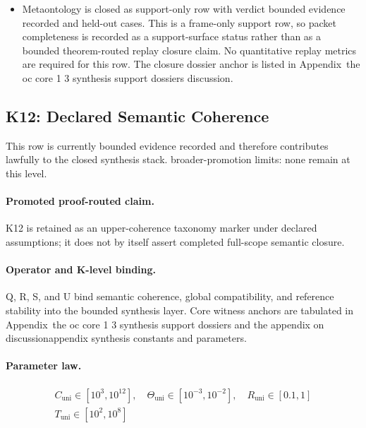 \begin{itemize}[leftmargin=1.6em,nosep]
\item Metaontology is closed as support-only row with verdict bounded evidence recorded and  held-out cases. This is a frame-only support row, so packet completeness is recorded as a support-surface status rather than as a bounded theorem-routed replay closure claim. No quantitative replay metrics are required for this row. The closure dossier anchor is listed in Appendix~the oc core 1 3 synthesis support dossiers discussion.
\end{itemize}

\subsection{K12: Declared Semantic Coherence}
\label{sec:oc-core-1-3-synthesis-k12}
This row is currently bounded evidence recorded and therefore contributes lawfully to the closed synthesis stack.
broader-promotion limits: none remain at this level.

\paragraph{Promoted proof-routed claim.}
K12 is retained as an upper-coherence taxonomy marker under declared assumptions; it does not by itself assert completed full-scope semantic closure.

\paragraph{Operator and K-level binding.}
Q, R, S, and U bind semantic coherence, global compatibility, and reference stability into the bounded synthesis layer.
Core witness anchors are tabulated in Appendix~the oc core 1 3 synthesis support dossiers and the appendix on discussionappendix synthesis constants and parameters.

\paragraph{Parameter law.}
\[
\begin{gathered} C_{\mathrm{uni}} \in [10^3,10^{12}],\quad \Theta_{\mathrm{uni}} \in [10^{-3},10^{-2}],\quad R_{\mathrm{uni}} \in [0.1,1] \\ T_{\mathrm{uni}} \in [10^2,10^8] \end{gathered}
\]

